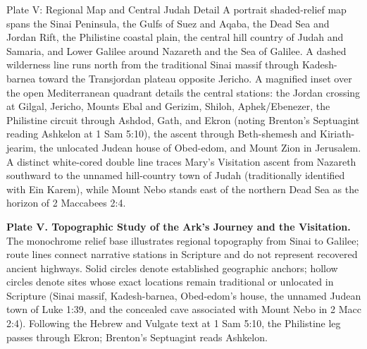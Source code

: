 \begin{center}
\end{center}\nopagebreak[4]
\else
\begin{studybox}{Plate V: Regional Map and Central Judah Detail}
A portrait shaded-relief map spans the Sinai Peninsula, the Gulfs of Suez and Aqaba, the Dead Sea and Jordan Rift, the Philistine coastal plain, the central hill country of Judah and Samaria, and Lower Galilee around Nazareth and the Sea of Galilee. A dashed wilderness line runs north from the traditional Sinai massif through Kadesh-barnea toward the Transjordan plateau opposite Jericho. A magnified inset over the open Mediterranean quadrant details the central stations: the Jordan crossing at Gilgal, Jericho, Mounts Ebal and Gerizim, Shiloh, Aphek/Ebenezer, the Philistine circuit through Ashdod, Gath, and Ekron (noting Brenton's Septuagint reading Ashkelon at 1 Sam 5:10), the ascent through Beth-shemesh and Kiriath-jearim, the unlocated Judean house of Obed-edom, and Mount Zion in Jerusalem. A distinct white-cored double line traces Mary's Visitation ascent from Nazareth southward to the unnamed hill-country town of Judah (traditionally identified with Ein Karem), while Mount Nebo stands east of the northern Dead Sea as the horizon of 2 Maccabees 2:4.
\end{studybox}
\fi

\begin{platecaption}
\textbf{Plate V. Topographic Study of the Ark's Journey and the Visitation.} The monochrome relief base illustrates regional topography from Sinai to Galilee; route lines connect narrative stations in Scripture and do not represent recovered ancient highways. Solid circles denote established geographic anchors; hollow circles denote sites whose exact locations remain traditional or unlocated in Scripture (Sinai massif, Kadesh-barnea, Obed-edom's house, the unnamed Judean town of Luke 1:39, and the concealed cave associated with Mount Nebo in 2 Macc 2:4). Following the Hebrew and Vulgate text at 1 Sam 5:10, the Philistine leg passes through Ekron; Brenton's Septuagint reads Ashkelon.
\end{platecaption}

